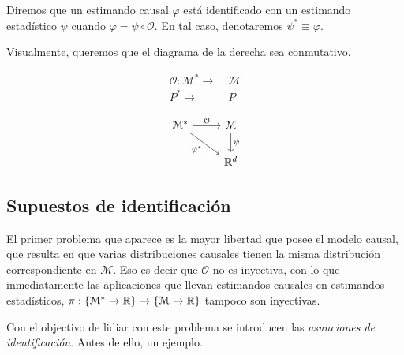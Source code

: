 \begin{definicion}[Identificación]
    Diremos que un estimando causal $\varphi$ está identificado con un estimando estadístico $\psi$ cuando
    $ \varphi = \psi \circ \mathcal{O}$.
    En tal caso, denotaremos $\psi^* \equiv \varphi$.
\end{definicion}

Visualmente, queremos que el diagrama de la derecha sea conmutativo.
\nopagebreak

\begin{minipage}{0.45\textwidth}
    \centering
    \begin{align*}
        \mathcal{O}: \mathcal{M}^* \to & \; \mathcal{M} \\
        P^* \mapsto                    & \; P
    \end{align*}
\end{minipage}
\hfill
\begin{minipage}{0.45\textwidth}
    \centering
    \[
        \begin{tikzcd}
            \mathcal{M}^* \arrow{r}{{\mathcal{O}}} \arrow[swap]{dr}{\psi^*} & \mathcal{M} \arrow{d}{\psi} \\
            & \R^d
        \end{tikzcd}
    \]
\end{minipage}

%



\subsection{Supuestos de identificación}

El primer problema que aparece es la mayor libertad que posee el modelo causal, que resulta en
que varias distribuciones causales tienen la misma distribución correspondiente en $\mathcal{M}$.
Eso es decir que $\mathcal{O}$ no es inyectiva, con lo que inmediatamente
las aplicaciones que llevan estimandos causales en estimandos estadísticos,
$\pi: \left\{\mathcal{M}^* \to \mathbb{R} \right\} \mapsto \left\{\mathcal{M} \to \mathbb{R} \right\}$ tampoco son inyectivas.

Con el objectivo de lidiar con este problema se introducen las \textit{asunciones de identificación}.
Antes de ello, un ejemplo.

